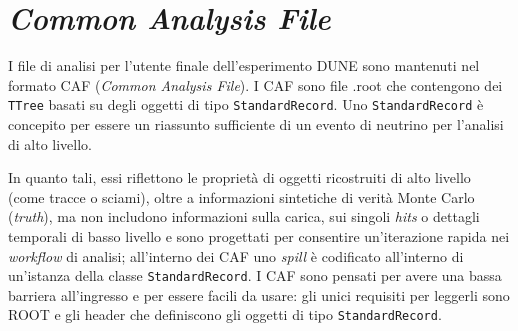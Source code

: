 \documentclass[../main.tex]{subfiles}
\begin{document}
\section{\textit{Common Analysis File}} \label{sec:common-analysis-file}
  I file di analisi per l'utente finale dell'esperimento DUNE sono mantenuti nel
  formato CAF (\textit{Common Analysis File}).
  I CAF sono file .root che contengono dei \texttt{TTree} basati su degli
  oggetti di tipo \texttt{StandardRecord}.
  Uno \texttt{StandardRecord} è concepito per essere un riassunto
  sufficiente di un evento di neutrino per l'analisi di alto livello.

  In quanto tali, essi riflettono le proprietà di oggetti ricostruiti di alto
  livello (come tracce o sciami), oltre a informazioni sintetiche di verità
  Monte Carlo (\textit{truth}), ma non includono informazioni sulla carica, sui
  singoli \textit{hits} o dettagli temporali di basso livello e sono
  progettati per consentire un'iterazione rapida nei \textit{workflow} di
  analisi; all'interno dei CAF uno \textit{spill} è codificato all'interno di
  un'istanza della classe \texttt{StandardRecord}.
  I CAF sono pensati per avere una bassa barriera all'ingresso e
  per essere facili da usare: gli unici requisiti per leggerli sono ROOT e
  gli header che definiscono gli oggetti di tipo \texttt{StandardRecord}.
\end{document}
